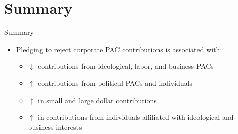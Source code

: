 \documentclass[12pt, aspectratio=169]{beamer}
\begin{document}
\section{Summary} \label{sec: summary}

\begin{frame}{Summary}
\begin{itemize}
	\item Pledging to reject corporate PAC contributions is associated with: \pause
	\begin{itemize}
		\item $\downarrow$ contributions from ideological, labor, and business PACs \pause
		\item $\uparrow$ contributions from political PACs and individuals \pause
		\item $\uparrow$ in small and large dollar contributions \pause
		\item $\uparrow$ in contributions from individuals affiliated with ideological and business interests
	\end{itemize}
\end{itemize}
\end{frame}
\end{document}
